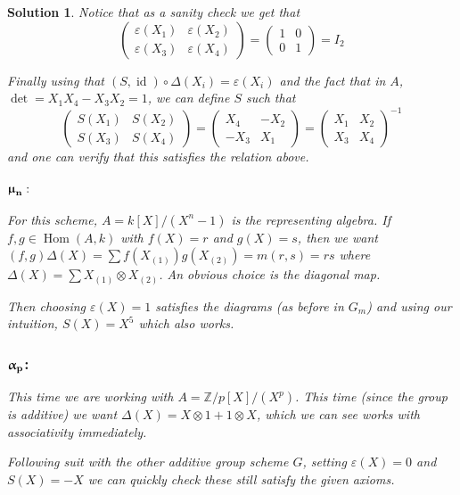 \documentclass[12pt]{article}
\theoremstyle{nonumberbreak}
\newtheorem{sol}{Solution}
\theoremstyle{changebreak}
\theoremstyle{nonumberplain}
\theoremstyle{change}
\newcommand*{\Z}{
\mathbb{Z}
}
\DeclareMathOperator{\Hom}{Hom}
\DeclareMathOperator{\id}{id}
\newcommand*{\mun}[1]{\ensuremath\mathbf{\bm\upmu_#1}}
\newcommand*{\alp}[1]{\ensuremath\mathbf{\bm\upalpha_#1}}
\begin{document}
\begin{sol}
	Notice that as a sanity check we get that 
	\[\begin{pmatrix}
		\varepsilon(X_1) & \varepsilon(X_2)\\
		\varepsilon(X_3) & \varepsilon(X_4)
	\end{pmatrix}=\begin{pmatrix}
		1 & 0\\
		0 & 1
	\end{pmatrix}=I_2\]

	Finally using that $(S,\id)\circ\Delta(X_i)=\varepsilon(X_i)$ and the fact that in $A$,
	$\det=X_1X_4-X_3X_2=1$, we can define $S$ such that
	\[\begin{pmatrix}
		S(X_1) & S(X_2)\\
		S(X_3) & S(X_4)
	\end{pmatrix}=\begin{pmatrix}
		X_4 & -X_2\\
		-X_3 & X_1
	\end{pmatrix}=\begin{pmatrix}
		X_1 & X_2\\
		X_3 & X_4
	\end{pmatrix}^{-1}\]
	and one can verify that this satisfies the relation above.
	\subsubsection*{$\mun{n}:$}
	For this scheme, $A=k[X]/(X^n-1)$ is the representing algebra. If $f,g\in\Hom(A,k)$ with
	$f(X)=r$ and $g(X)=s$, then we want $(f,g)\Delta(X)=\sum f(X_{(1)})g(X_{(2)})=m(r,s)=rs$ where 
	$\Delta(X)=\sum X_{(1)}\otimes X_{(2)}$. An obvious choice is the diagonal map.

	Then choosing $\varepsilon(X)=1$ satisfies the diagrams (as before in $G_m$) and using our
	intuition, $S(X)=X^5$ which also works.
	\subsubsection*{$\alp{p}$:}
	This time we are working with $A=\Z/p[X]/(X^p)$. This time (since the group is additive) we want
	$\Delta(X)=X\otimes 1+1\otimes X$, which we can see works with associativity immediately.

	Following suit with the other additive group scheme $G$, setting $\varepsilon(X)=0$ and $S(X)=-X$
	we can quickly check these still satisfy the given axioms.
\end{sol}
\end{document}
